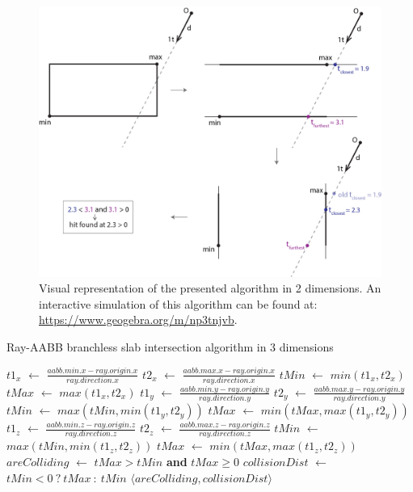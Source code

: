 \documentclass{PoliMi_MasterThesis}
\newcommand*\Let[2]{\State #1 $\gets$ #2}
\newcommand*\AAnd{\textbf{ and }}
\begin{document}
\begin{figure}[H]
    \centering
    \includegraphics[width=\textwidth]{Images/ray_aabb_intersection.png}
    \caption{Visual representation of the presented algorithm in 2 dimensions. An interactive simulation of this algorithm can be found at: \url{https://www.geogebra.org/m/np3tnjvb}.}
    \label{fig:ray_aabb_intersection}
\end{figure}

\begin{algorithm}[H]
	\caption{Ray-AABB branchless slab intersection algorithm in 3 dimensions}
	\begin{algorithmic}[1]
		\Let {$t1_x$}{$\frac{aabb.min.x - ray.origin.x}{ray.direction.x}$} 
		\Let {$t2_x$}{$\frac{aabb.max.x - ray.origin.x}{ray.direction.x}$}
		\Let {$tMin$}{$min(t1_x, t2_x)$}
		\Let {$tMax$}{$max(t1_x, t2_x)$}
		\Let {$t1_y$}{$\frac{aabb.min.y - ray.origin.y}{ray.direction.y}$} 
		\Let {$t2_y$}{$\frac{aabb.max.y - ray.origin.y}{ray.direction.y}$}
		\Let {$tMin$}{$ max(tMin, min(t1_y, t2_y))$}
		\Let {$tMax$}{$ min(tMax, max(t1_y, t2_y))$}
		\Let {$t1_z$}{$\frac{aabb.min.z - ray.origin.z}{ray.direction.z}$} 
		\Let {$t2_z$}{$\frac{aabb.max.z - ray.origin.z}{ray.direction.z}$}
		\Let {$tMin$}{$max(tMin, min(t1_z, t2_z))$}
		\Let {$tMax$}{$min(tMax, max(t1_z, t2_z))$}
		\Let {$areColliding$}{$tMax > tMin$ \AAnd $tMax \geq 0$}
		\Let {$collisionDist$}{$tMin < 0 \: ? \: tMax \: : \: tMin$}
		\State \Return $\langle areColliding, collisionDist \rangle$
		\EndFunction
	\end{algorithmic}
\end{algorithm} 
\end{document}
